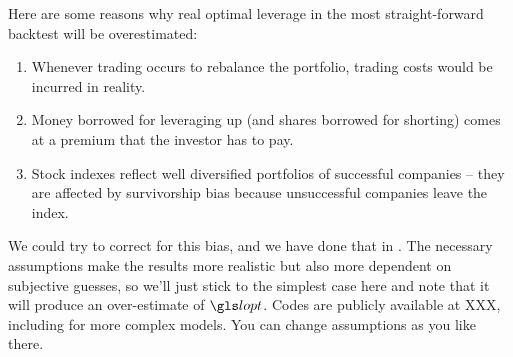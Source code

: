 Here are some reasons why real optimal leverage in the most straight-forward backtest will be overestimated: 
\begin{enumerate}
\item Whenever trading occurs to rebalance the portfolio, trading costs would be incurred in reality. 
\item Money borrowed for leveraging up (and shares borrowed for shorting) comes at a premium that the investor has to pay. 
\item Stock indexes reflect well diversified portfolios of successful companies -- they are affected by survivorship bias because unsuccessful companies leave the index. 
\end{enumerate}
We could try to correct for this bias, and we have done that in \cite{PetersAdamou2011}. The necessary assumptions make the results more realistic but also more dependent on subjective guesses, so we'll just stick to the simplest case here and note that it will produce an over-estimate of $\lopt$. Codes are publicly available at XXX, including for more complex models. You can change assumptions as you like there.
\FloatBarrier

